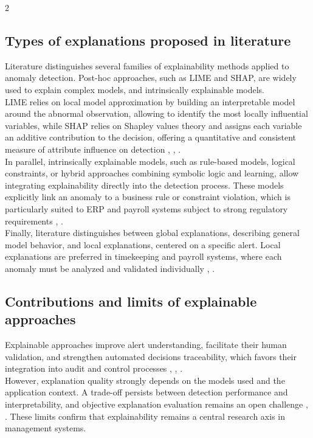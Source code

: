 \documentclass[10pt]{article}
\begin{document}
\begin{multicols}{2}
            \subsection{Types of explanations proposed in literature}
            Literature distinguishes several families of explainability methods applied to anomaly detection. Post-hoc approaches, such as LIME and SHAP, are widely used to explain complex models, and intrinsically explainable models.\\
            LIME relies on local model approximation by building an interpretable model around the abnormal observation, allowing to identify the most locally influential variables, while SHAP relies on Shapley values theory and assigns each variable an additive contribution to the decision, offering a quantitative and consistent measure of attribute influence on detection \cite{ref4}, \cite{ref6}, \cite{ref11}.\\
            In parallel, intrinsically explainable models, such as rule-based models, logical constraints, or hybrid approaches combining symbolic logic and learning, allow integrating explainability directly into the detection process. These models explicitly link an anomaly to a business rule or constraint violation, which is particularly suited to ERP and payroll systems subject to strong regulatory requirements \cite{ref7}, \cite{ref9}.\\
            Finally, literature distinguishes between global explanations, describing general model behavior, and local explanations, centered on a specific alert. Local explanations are preferred in timekeeping and payroll systems, where each anomaly must be analyzed and validated individually \cite{ref5}, \cite{ref6}.

        \subsection{Contributions and limits of explainable approaches}
        Explainable approaches improve alert understanding, facilitate their human validation, and strengthen automated decisions traceability, which favors their integration into audit and control processes \cite{ref5}, \cite{ref11}, \cite{ref3}.\\
        However, explanation quality strongly depends on the models used and the application context. A trade-off persists between detection performance and interpretability, and objective explanation evaluation remains an open challenge \cite{ref5}, \cite{ref6}. These limits confirm that explainability remains a central research axis in management systems.


\end{multicols}
\end{document}
